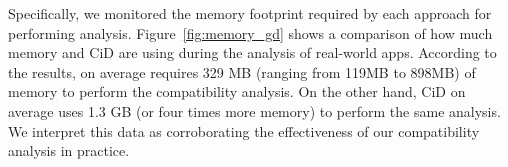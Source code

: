 Specifically, we monitored the memory footprint
required by each approach for performing analysis.
Figure~\ref{fig:memory_gd} shows a comparison of how
much memory \@approach and {\sc CiD} are using during
the analysis of real-world apps. According to the
results, \@approach on average requires 329 MB (ranging
from 119MB to 898MB) of memory to perform the
compatibility analysis. On the other hand, {\sc CiD} on
average uses 1.3 GB (or four times more memory) to
perform the same analysis.  We interpret this data as
corroborating the effectiveness of our compatibility analysis in
practice.


